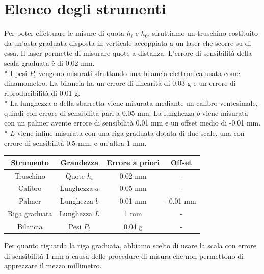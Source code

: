 \documentclass[10pt,a4paper]{book}
\begin{document}
\section*{Elenco degli strumenti}
Per poter effettuare le misure di quota $h_i$ e $h_0$, sfruttiamo un truschino costituito da un'asta graduata disposta in verticale
accoppiata a un laser che scorre su di essa. Il laser permette di misurare quote a distanza. L'errore di sensibilità della scala graduata è di 0.02 mm.\\*
I pesi $P_i$ vengono misurati sfruttando una bilancia elettronica usata come dinamometro. La bilancia ha un errore di linearità di 0.03 g e un errore di riproducibilità di 0.01 g.\\*
La lunghezza $a$ della sbarretta viene misurata mediante un calibro ventesimale, quindi con errore di sensibilità pari a 0.05 mm. La lunghezza $b$ viene misurata con un palmer avente errore di sensibilità 0.01 mm e un offset medio di -0.01 mm.\\*
$L$ viene infine misurata con una riga graduata dotata di due scale, una con errore di sensibilità 0.5 mm, e un'altra 1 mm.
\begin{center}
\begin{tabular}{|c|c|c|c|}
	\hline 
	\textbf{Strumento} & \textbf{Grandezza} & \textbf{Errore a priori} & \textbf{Offset} \\ 
	\hline 
	Truschino & Quote $h_i$ & 0.02 mm & -  \\ 
	\hline 
	Calibro & Lunghezza $a$ & 0.05 mm & - \\ 
	\hline 
	Palmer & Lunghezza $b$ & 0.01 mm & -0.01 mm \\ 
	\hline 
	Riga graduata & Lunghezza $L$ & 1 mm & - \\ 
	\hline 
	Bilancia & Pesi $P_i$ & 0.04 g & - \\ 
	\hline 
\end{tabular}
\end{center}
Per quanto riguarda la riga graduata, abbiamo scelto di usare la scala con errore di sensibilità 1 mm a causa delle procedure di misura che non permettono di apprezzare il mezzo millimetro.
\end{document}
